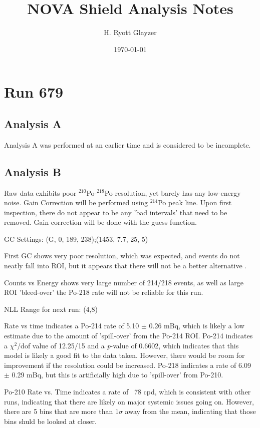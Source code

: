 \documentclass[letterpaper, 12pt]{article}
\begin{document}
\title{NOVA Shield Analysis Notes}
\author{H. Ryott Glayzer}
\date{\today}
\maketitle

\section{Run 679}
\subsection{Analysis A}
Analysis A was performed at an earlier time and is considered to be incomplete.

\subsection{Analysis B}
Raw data exhibits poor $^{210}$Po-$^{218}$Po resolution, yet barely has any 
low-energy noise. Gain Correction will be performed using $^{214}$Po peak line.
Upon first inspection, there do not appear to be any 'bad intervals' that need 
to be removed. Gain correction will be done with the guess function.

GC Settings: (G, 0, 189, 238);(1453, 7.7, 25, 5)

First GC shows very poor resolution, which was expected, and events do not 
neatly fall into ROI, but it appears that there will not be a better alternative
.

Counts vs Energy shows very large number of 214/218 events, as well as large ROI
'bleed-over' the Po-218 rate will not be reliable for this run.

NLL Range for next run: (4,8)

Rate vs time indicates a Po-214 rate of 5.10 $\pm$ 0.26 mBq, which is likely 
a low estimate due to the amount of 'spill-over' from the Po-214 ROI.
Po-214 indicates a $\chi$$^{2}$/dof value of 12.25/15 and a 
\textit{p}-value of 0.6602, which indicates that this model is likely a good fit
to the data taken. 
However, there would be room for improvement if the resolution could be 
increased.
Po-218 indicates a rate of 6.09 $\pm$ 0.29 mBq, but this is artificially high 
due to 'spill-over' from Po-210.

Po-210 Rate vs. Time indicates a rate of ~78 cpd, which is consistent with other
runs, indicating that there are likely on major systemic issues going on.
However, there are 5 bins that are more than 1$\sigma$ away from the mean,
indicating that those bins shuld be looked at closer.
\end{document}
